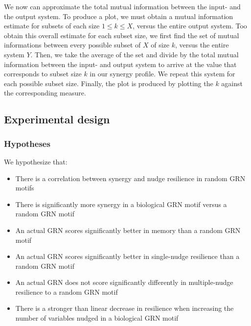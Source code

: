 \documentclass[../main.tex]{subfiles}
\begin{document}
We now can approximate the total mutual information between the input- and the output system.
To produce a plot, we must obtain a mutual information estimate for subsets of each size $1 \le k \le X$, versus the entire output system.
Too obtain this overall estimate for each subset size, we first find the set of mutual informations between every possible subset of $X$ of size $k$, versus the entire system $Y$.
Then, we take the average of the set and divide by the total mutual information between the input- and output system to arrive at the value that corresponds to subset size $k$ in our synergy profile.
We repeat this system for each possible subset size.
Finally, the plot is produced by plotting the $k$ against the corresponding measure.

\subsection{Experimental design}

\subsubsection{Hypotheses}

We hypothesize that:

\begin{itemize}
\item There is a correlation between synergy and nudge resilience in random GRN motifs
\item There is significantly more synergy in a biological GRN motif versus a random GRN motif
\item An actual GRN scores significantly better in memory than a random GRN motif
\item An actual GRN scores significantly better in single-nudge resilience than a random GRN motif
\item An actual GRN does not score significantly differently in multiple-nudge resilience to a random GRN motif
\item There is a stronger than linear decrease in resilience when increasing the number of variables nudged in a biological GRN motif
\end{itemize}


\end{document}
